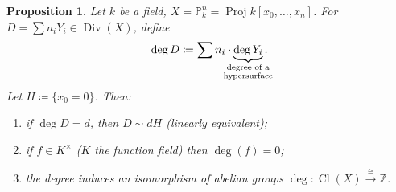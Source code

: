 \documentclass[12pt]{article}
\DeclareMathOperator{\Proj}{Proj}
\DeclareMathOperator{\Div}{Div}
\DeclareMathOperator{\Cl}{Cl}
\newtheorem*{proposition}{Proposition}
\theoremstyle{definition}
\theoremstyle{remark}
\newtheorem*{comment}{Comment}
\begin{document}
\begin{proposition}
Let $k$ be a field, $X=\mathbb{P}_k^n=\Proj k[x_0,\ldots,x_n]$. For $D=\sum n_iY_i\in\Div(X)$, define
\[\deg D\coloneqq\sum n_i\cdot\underbrace{\deg Y_i}_{\mathclap{\substack{\text{degree of a}\\\text{hypersurface}}}}.\]
Let $H\coloneqq\{x_0=0\}$. Then:
\begin{enumerate}[label=\arabic*)]
\item\label{linearly_equivalent} if $\deg D=d$, then $D\sim dH$ (linearly equivalent);
\item if $f\in K^{\times}$ ($K$ the function field) then $\deg(f)=0$;
\item the degree induces an isomorphism of abelian groups $\deg:\Cl(X)\xrightarrow{\cong}\mathbb{Z}$.
\end{enumerate}
\end{proposition}

\begin{comment}
We take the projective space instead of the affine space to take into account what happens at the infinity.
\end{comment}
\end{document}

